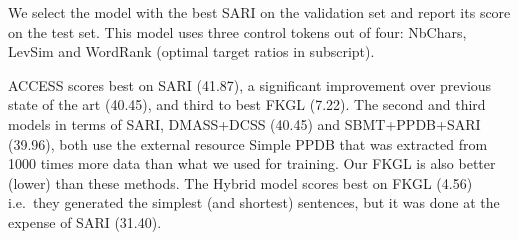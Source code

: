 \documentclass[10pt, a4paper]{article}
\begin{document}
\begin{table}
\caption{Comparison to the literature. We report the results of the model that performed the best on the validation set among all runs and parametrizations. The ratios used for parametrizations are written as subscripts.}
\label{comparison_to_sota}
\end{table}


We select the model with the best SARI on the validation set and report its score on the test set. This model uses three control tokens out of four: NbChars, LevSim and WordRank (optimal target ratios in subscript).

\textsc{ACCESS} scores best on SARI (41.87), a significant improvement over previous state of the art (40.45), and third to best FKGL (7.22).
The second and third models in terms of SARI, DMASS+DCSS (40.45) and SBMT+PPDB+SARI (39.96), both use the external resource Simple PPDB \cite{pavlick2016simple} that was extracted from 1000 times more data than what we used for training. Our FKGL is also better (lower) than these methods.
The Hybrid model scores best on FKGL (4.56) i.e.~they generated the simplest (and shortest) sentences, but it was done at the expense of SARI (31.40).
\end{document}
